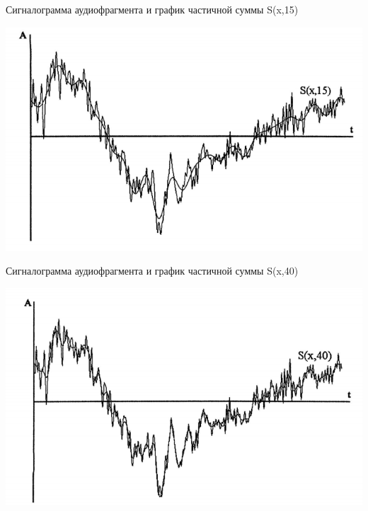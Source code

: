\documentclass{beamer}
\begin{document}
\begin{frame}
\begin{block}{Сигналограмма аудиофрагмента и график частичной суммы S(x,15)}
\begin{center}
\includegraphics[scale=0.6]{pic-specter-07}
\end{center}
\end{block}
\end{frame} 

\begin{frame}
\begin{block}{Сигналограмма аудиофрагмента и график частичной суммы S(x,40)}
\begin{center}
\includegraphics[scale=0.6]{pic-specter-08}
\end{center}
\end{block}
\end{frame} 
\end{document}
